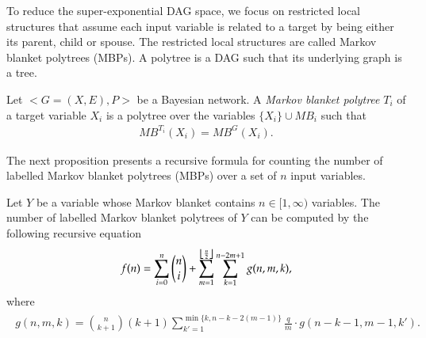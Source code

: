 To reduce the super-exponential DAG space, we focus on restricted local structures that assume each input variable is related to a target by being either its parent, child or spouse. The restricted local structures are called Markov blanket polytrees (MBPs). A polytree is a DAG such that its underlying graph is a tree. 
\begin{definition}
Let $<G=(X,E),P>$ be a Bayesian network. A \textit{Markov blanket polytree} $T_i$ of a target variable $X_i$ is a polytree over the variables $\{X_i\} \cup MB_i$ such that 
\begin{align*}
MB^{T_i}(X_i) = MB^G(X_i).
\end{align*}
\end{definition}


The next proposition presents a recursive formula for counting the number of labelled Markov blanket polytrees (MBPs) over a set of $n$ input variables. 
\begin{proposition}
\label{prop:nmbps}
Let $Y$ be a variable whose Markov blanket contains $n \in [1, \infty)$ variables. The number of labelled Markov blanket polytrees of $Y$ can be computed by the following recursive equation
\begin{align}
\label{eq:nmbps}
f(n) = \sum_{i=0}^n {n \choose i} + \sum_{m=1}^{\floor*{\frac{n}{2}}} \sum_{k=1}^{n-2m+1} g(n,m,k),
\end{align}
where
\begin{align*}
\begin{split}
g(n,m,k) = 
{n \choose k+1}(k+1) \sum_{k'=1}^{\min\{k, n-k-2(m-1)\}}\frac{q}{m} \cdot g(n-k-1,m-1,k').
\end{split}
\end{align*}
\end{proposition}

